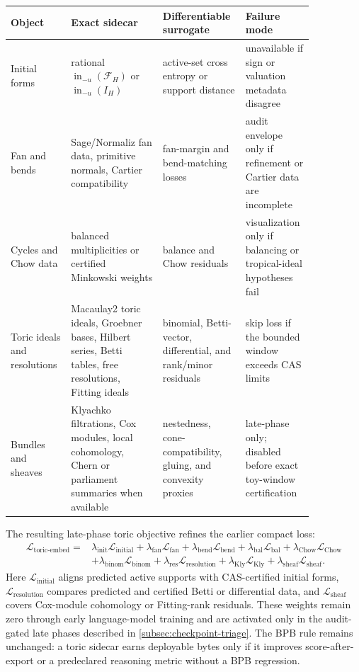 \documentclass[11pt]{article}
\theoremstyle{definition}
\theoremstyle{plain}
\theoremstyle{remark}
\numberwithin{equation}{section}
\begin{document}
\begin{center}
\scriptsize
\begin{tabular}{@{}p{0.17\linewidth}p{0.29\linewidth}p{0.22\linewidth}p{0.17\linewidth}@{}}
\toprule
Object & Exact sidecar & Differentiable surrogate & Failure mode \\
\midrule
Initial forms & rational $\operatorname{in}_{-u}(\mathcal F_H)$ or $\operatorname{in}_{-u}(I_H)$ & active-set cross entropy or support distance & unavailable if sign or valuation metadata disagree \\
Fan and bends & Sage/Normaliz fan data, primitive normals, Cartier compatibility & fan-margin and bend-matching losses & audit envelope only if refinement or Cartier data are incomplete \\
Cycles and Chow data & balanced multiplicities or certified Minkowski weights & balance and Chow residuals & visualization only if balancing or tropical-ideal hypotheses fail \\
Toric ideals and resolutions & Macaulay2 toric ideals, Groebner bases, Hilbert series, Betti tables, free resolutions, Fitting ideals & binomial, Betti-vector, differential, and rank/minor residuals & skip loss if the bounded window exceeds CAS limits \\
Bundles and sheaves & Klyachko filtrations, Cox modules, local cohomology, Chern or parliament summaries when available & nestedness, cone-compatibility, gluing, and convexity proxies & late-phase only; disabled before exact toy-window certification \\
\bottomrule
\end{tabular}
\end{center}

The resulting late-phase toric objective refines the earlier compact loss:
\begin{equation}
\begin{split}
  \mathcal L_{\mathrm{toric\text{-}embed}}
  ={}&
  \lambda_{\mathrm{init}}\mathcal L_{\mathrm{initial}}
  +\lambda_{\mathrm{fan}}\mathcal L_{\mathrm{fan}}
  +\lambda_{\mathrm{bend}}\mathcal L_{\mathrm{bend}}
  +\lambda_{\mathrm{bal}}\mathcal L_{\mathrm{bal}}
  +\lambda_{\mathrm{Chow}}\mathcal L_{\mathrm{Chow}}\\
  &+
  \lambda_{\mathrm{binom}}\mathcal L_{\mathrm{binom}}
  +\lambda_{\mathrm{res}}\mathcal L_{\mathrm{resolution}}
  +\lambda_{\mathrm{Kly}}\mathcal L_{\mathrm{Kly}}
  +\lambda_{\mathrm{sheaf}}\mathcal L_{\mathrm{sheaf}}.
\end{split}
\end{equation}
Here $\mathcal L_{\mathrm{initial}}$ aligns predicted active supports with CAS-certified initial forms, $\mathcal L_{\mathrm{resolution}}$ compares predicted and certified Betti or differential data, and $\mathcal L_{\mathrm{sheaf}}$ covers Cox-module cohomology or Fitting-rank residuals.  These weights remain zero through early language-model training and are activated only in the audit-gated late phases described in \cref{subsec:checkpoint-triage}.  The BPB rule remains unchanged: a toric sidecar earns deployable bytes only if it improves score-after-export or a predeclared reasoning metric without a BPB regression.
\end{document}
